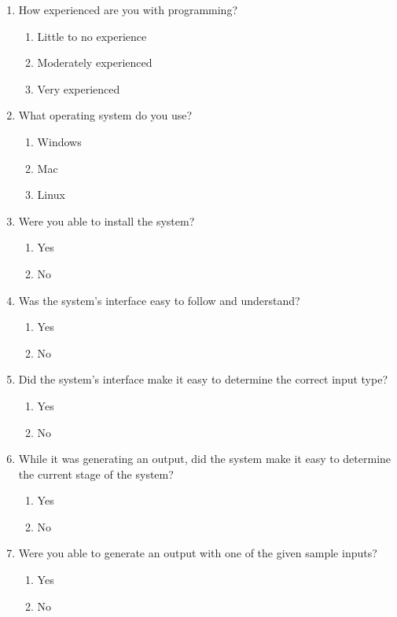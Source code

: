 \documentclass[12pt, titlepage]{article}
\begin{document}
\begin{enumerate}

\item How experienced are you with programming?
   \begin{enumerate}
     \item Little to no experience
     \item Moderately experienced
     \item Very experienced
   \end{enumerate}

\item What operating system do you use?
   \begin{enumerate}
     \item Windows
     \item Mac
     \item Linux
   \end{enumerate}

\item Were you able to install the system?
   \begin{enumerate}
     \item Yes
     \item No
   \end{enumerate}
   
\item Was the system's interface easy to follow and understand?
   \begin{enumerate}
     \item Yes
     \item No
   \end{enumerate}

\item Did the system's interface make it easy to determine the correct input type?
   \begin{enumerate}
     \item Yes
     \item No
   \end{enumerate}

\item While it was generating an output, did the system make it easy to determine the current stage of the system?
   \begin{enumerate}
     \item Yes
     \item No
   \end{enumerate}

\item Were you able to generate an output with one of the given sample inputs?
   \begin{enumerate}
     \item Yes
     \item No
   \end{enumerate}
  

\end{enumerate}
\end{document}
